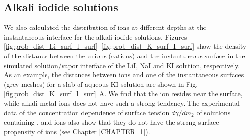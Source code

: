 \subsection{Alkali iodide solutions}
We also calculated the distribution of ions at different depths at the instantaneous interface for the alkali iodide solutions.
Figures \ref{fig:prob_dist_Li_surf_I_surf}--\ref{fig:prob_dist_K_surf_I_surf} show the density of the distance between the anions (cations) 
and the instantaneous surface in the simulated solution/vapor interface of the LiI, NaI and KI solution, respectively. 
As an example, the distances between ions and one of the instantaneous surfaces (grey meshes) 
for a slab of aqueous KI solution are shown in Fig.\thinspace\ref{fig:prob_dist_K_surf_I_surf} A. 
We find that the \I ion resides near the surface, while alkali metal ions does not have such a strong tendency. 
The experimental data of the concentration dependence of surface tension $d\gamma/dm_2$ of solutions 
containing \Li, \Na and \K ions also show that they do not have the strong surface propensity of \I ions (see Chapter \thinspace\ref{CHAPTER_1}).


